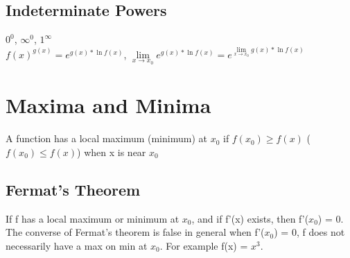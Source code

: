 \documentclass{article}
\begin{document}
 
 
\subsection{Indeterminate Powers}
$0^0$, $\infty^0$, $1^\infty$ \\
$f(x)^{g(x)} = e^{g(x)*\ln f(x)}$, $\lim\limits_{x\to x_0} e^{g(x)*\ln f(x)} = e^{\lim\limits_{x\to x_0}g(x)*\ln f(x)}$

\section{Maxima and Minima}
A function has a local maximum (minimum) at $x_0$ if $f(x_0) \geq f(x)$ ($f(x_0) \leq f(x)$) when x is near $x_0$
 
 
 
\subsection{Fermat's Theorem}
If f has a local maximum or minimum at $x_0$, and if f'(x) exists, then f'($x_0$) = 0.\\
The converse of Fermat's theorem is false in general when f'($x_0$) = 0, f does not necessarily have a max on min at $x_0$. For example f(x) = $x^3$.
 
 
 
 
 
 
 
 
 
 
 
 
 
\end{document}
